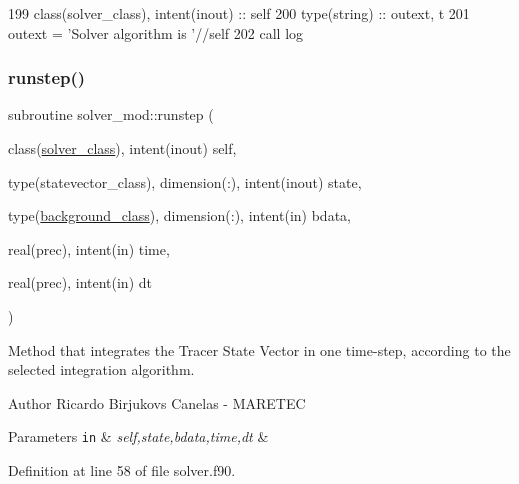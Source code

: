\begin{DoxyCode}
199     \textcolor{keywordtype}{class}(solver\_class), \textcolor{keywordtype}{intent(inout)} :: self
200     \textcolor{keywordtype}{type}(string) :: outext, t
201     outext = \textcolor{stringliteral}{'Solver algorithm is '}//self%
202     \textcolor{keyword}{call }log%
\end{DoxyCode}
\mbox{\label{namespacesolver__mod_a75c5c8b01ae4ae193ff03dbe7e5fc6af}} 
\subsubsection{\texorpdfstring{runstep()}{runstep()}}
{\footnotesize\ttfamily subroutine solver\+\_\+mod\+::runstep (\begin{DoxyParamCaption}\item[{class(\mbox{\hyperlink{structsolver__mod_1_1solver__class}{solver\+\_\+class}}), intent(inout)}]{self,  }\item[{type(statevector\+\_\+class), dimension(\+:), intent(inout)}]{state,  }\item[{type(\mbox{\hyperlink{structbackground__mod_1_1background__class}{background\+\_\+class}}), dimension(\+:), intent(in)}]{bdata,  }\item[{real(prec), intent(in)}]{time,  }\item[{real(prec), intent(in)}]{dt }\end{DoxyParamCaption})\hspace{0.3cm}{\ttfamily [private]}}



Method that integrates the Tracer State Vector in one time-\/step, according to the selected integration algorithm. 

\begin{DoxyAuthor}{Author}
Ricardo Birjukovs Canelas -\/ M\+A\+R\+E\+T\+EC 
\end{DoxyAuthor}

\begin{DoxyParams}[1]{Parameters}
\mbox{\tt in}  & {\em self,state,bdata,time,dt} & \\
\hline
\end{DoxyParams}


Definition at line 58 of file solver.\+f90.


